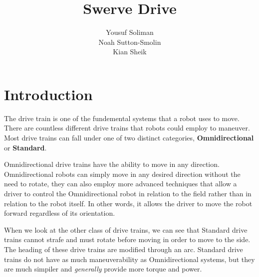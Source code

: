 \documentclass[a4paper]{article}
\title{Swerve Drive}
\author{Yousuf Soliman\\Noah Sutton-Smolin\\Kian Sheik}
\begin{document}
\maketitle
\section{Introduction}
The drive train is one of the fundemental systems that a robot uses to move. There are countless different drive trains that robots could employ to maneuver. Most drive trains can fall under one of two distinct categories, \textbf{Omnidirectional} or \textbf{Standard}. 

Omnidirectional drive trains have the ability to move in any direction. Omnidirectional robots can simply move in any desired direction without the need to rotate, they can also employ more advanced techniques that allow a driver to control the Omnidirectional robot in relation to the field rather than in relation to the robot itself. In other words, it allows the driver to move the robot forward regardless of its orientation. 

When we look at the other class of drive trains, we can see that Standard drive trains cannot strafe and must rotate before moving in order to move to the side. The heading of these drive trains are modified through an arc. Standard drive trains do not have as much maneuverability as Omnidirectional systems, but they are much simpiler and \textit{generally} provide more torque and power. 
\end{document}
